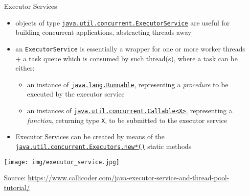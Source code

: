 \documentclass{beamer}\mode<presentation>{\usetheme{AMSBolognaFC}}
\begin{document}
\begin{frame}[c,allowframebreaks]{Executor Services}

	\begin{itemize}
		\item objects of type \href{https://docs.oracle.com/javase/8/docs/api/java/util/concurrent/ExecutorService.html}{\texttt{java.util.concurrent.\alert{ExecutorService}}} are useful for building \alert{concurrent} applications, abstracting threads away

		\bigskip

		\item an \alert{\texttt{ExecutorService}} is essentially a wrapper for one or more \alert{worker} threads + a \alert{task queue} which is consumed by such thread(s), where a task can be either:
		\begin{itemize}
			\item an instance of \href{https://docs.oracle.com/javase/8/docs/api/java/lang/Runnable.html}{\texttt{java.lang.\alert{Runnable}}}, representing a \emph{procedure} to be \alert{executed} by the executor service

			\item an instances of \href{https://docs.oracle.com/javase/8/docs/api/java/util/concurrent/Callable.html}{\texttt{java.util.concurrent.\alert{Callable<X>}}}, representing a \emph{function}, returning type \texttt{X}, to be \alert{submitted} to the executor service
		\end{itemize}

		\bigskip

		\item Executor Services can be created by means of the \href{https://docs.oracle.com/javase/8/docs/api/java/util/concurrent/Executors.html}{\texttt{java.util.concurrent.Executor\alert{s}.new*()}} static methods
	\end{itemize}

	\framebreak

	\begin{center}
		\texttt{[image: img/executor\_service.jpg]}

		{\tiny Source: \url{https://www.callicoder.com/java-executor-service-and-thread-pool-tutorial/}}
	\end{center}

	\framebreak

	

\end{frame}
\end{document}
